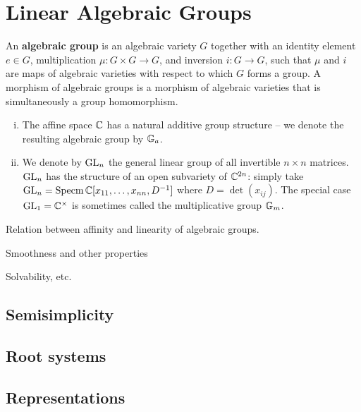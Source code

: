 \chapter{Linear Algebraic Groups}


\begin{definition}
    An \textbf{algebraic group} is an algebraic variety $G$ together with an identity
    element $e\in G$, multiplication $\mu:G\times G\to G$, and inversion
    $i:G\to G$, such that $\mu$ and $i$ are maps of algebraic varieties
    with respect to which $G$ forms a group. A morphism of algebraic groups
    is a morphism of algebraic varieties that is simultaneously a group
    homomorphism.
\end{definition}

\begin{example}
    \hspace{1mm} 
    \begin{enumerate}[(i)]
        \item The affine space $\mathbb{C}$ has a natural additive group structure --
            we denote the resulting algebraic group by $\mathbb{G}_a$.
        \item We denote by $\operatorname{GL}_n$ the general linear group of all invertible
            $n\times n$ matrices. $\operatorname{GL}_n$ has the structure of an open subvariety
            of $\mathbb{C}^{2n}$: simply take $\operatorname{GL}_n=\operatorname{Specm}\mathbb{C}[x_{11},\ldots,x_{nn},D^{-1}]$
            where $D=\det(x_{ij})$. The special case $\operatorname{GL}_1=\mathbb{C}^\times$ is sometimes
            called the multiplicative group $\mathbb{G}_m$.
    \end{enumerate}
\end{example}

\begin{theorem}
    Relation between affinity and linearity of algebraic groups.
\end{theorem}

\begin{theorem}
    Smoothness and other properties
\end{theorem}

\begin{definition}
    Solvability, etc.
\end{definition}

\section{Semisimplicity}
\section{Root systems}
\section{Representations}
